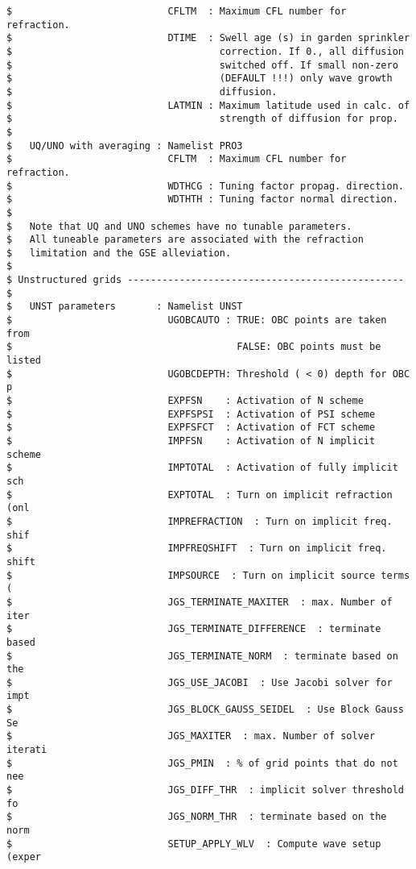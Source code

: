 \begin{footnotesize}
\begin{verbatim}
$                           CFLTM  : Maximum CFL number for refraction.
$                           DTIME  : Swell age (s) in garden sprinkler
$                                    correction. If 0., all diffusion
$                                    switched off. If small non-zero
$                                    (DEFAULT !!!) only wave growth
$                                    diffusion.
$                           LATMIN : Maximum latitude used in calc. of
$                                    strength of diffusion for prop.
$
$   UQ/UNO with averaging : Namelist PRO3
$                           CFLTM  : Maximum CFL number for refraction.
$                           WDTHCG : Tuning factor propag. direction.
$                           WDTHTH : Tuning factor normal direction.
$
$   Note that UQ and UNO schemes have no tunable parameters.
$   All tuneable parameters are associated with the refraction
$   limitation and the GSE alleviation.
$
$ Unstructured grids ------------------------------------------------ $
$   UNST parameters       : Namelist UNST 
$                           UGOBCAUTO : TRUE: OBC points are taken from 
$                                       FALSE: OBC points must be listed
$                           UGOBCDEPTH: Threshold ( < 0) depth for OBC p
$                           EXPFSN    : Activation of N scheme
$                           EXPFSPSI  : Activation of PSI scheme
$                           EXPFSFCT  : Activation of FCT scheme
$                           IMPFSN    : Activation of N implicit scheme
$                           IMPTOTAL  : Activation of fully implicit sch
$                           EXPTOTAL  : Turn on implicit refraction (onl
$                           IMPREFRACTION  : Turn on implicit freq. shif
$                           IMPFREQSHIFT  : Turn on implicit freq. shift
$                           IMPSOURCE  : Turn on implicit source terms (
$                           JGS_TERMINATE_MAXITER  : max. Number of iter
$                           JGS_TERMINATE_DIFFERENCE  : terminate based 
$                           JGS_TERMINATE_NORM  : terminate based on the
$                           JGS_USE_JACOBI  : Use Jacobi solver for impt
$                           JGS_BLOCK_GAUSS_SEIDEL  : Use Block Gauss Se
$                           JGS_MAXITER  : max. Number of solver iterati
$                           JGS_PMIN  : % of grid points that do not nee
$                           JGS_DIFF_THR  : implicit solver threshold fo
$                           JGS_NORM_THR  : terminate based on the norm 
$                           SETUP_APPLY_WLV  : Compute wave setup (exper

\end{verbatim}
\end{footnotesize}
